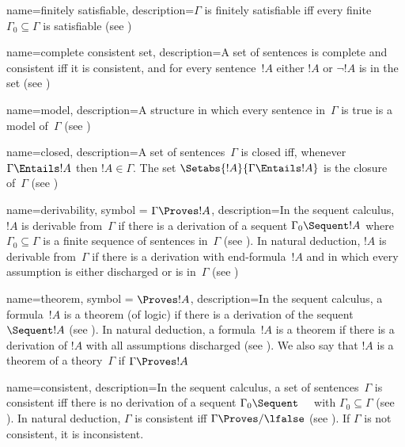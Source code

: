  {
  name={finitely satisfiable},  
  description={$\Gamma$ is finitely satisfiable iff every finite
    $\Gamma_0 \subseteq \Gamma$ is satisfiable (see
    )} }

 {
  name=complete consistent set,
  description={A set of {sentence}s is complete and consistent iff it
    is consistent, and for every {sentence}~$!A$ either $!A$ or
    $\lnot !A$ is in the set (see )} }

 {
  name=model,  
  description={A {structure} in which every {sentence}
    in~$\Gamma$ is true is a model of~$\Gamma$ (see
    )} }

 {
  name=closed, 
  description={A set of {sentence}s~$\Gamma$ is closed iff, whenever
    $\Gamma \Entails !A$ then $!A \in \Gamma$. The set
    $\Setabs{!A}{\Gamma \Entails !A}$ is the closure of~$\Gamma$ (see
    )} }

 {
  name=derivability,
  symbol = {\ensuremath{\Gamma \Proves !A}},  
  description={In the sequent calculus, $!A$ is {derivable} from~$\Gamma$ if there is a
    \gls{derivation} of a \gls{sequent} $\Gamma_0 \Sequent !A$ 
    where $\Gamma_0 \subseteq \Gamma$ is a finite sequence of sentences in~$\Gamma$ (see
    ). In natural deduction, $!A$ is {derivable} from~$\Gamma$ if there is a
    {derivation} with end-{formula}~$!A$ and in which every
    assumption is either {discharged} or is in~$\Gamma$ (see
    )} }

 {
  name={theorem},
  symbol = {\ensuremath{\Proves !A}},
  description={In the sequent calculus, a {formula}~$!A$ is a theorem
    (of logic) if there is a {derivation} of the sequent $\Sequent !A$
    (see ).  In natural deduction, a
    {formula}~$!A$ is a theorem if there is a {derivation} of $!A$
    with all assumptions \gls{discharged}
    (see ). We also say that $!A$ is a
    theorem of a theory~$\Gamma$ if $\Gamma \Proves !A$} }

 {
  name=consistent,
  description={In the sequent calculus, a set of sentences~$\Gamma$ is
    consistent iff there is no \gls{derivation} of a \gls{sequent}
    $\Gamma_0 \Sequent \quad$ with $\Gamma_0 \subseteq \Gamma$
    (see ). In natural deduction, $\Gamma$
    is consistent iff $\Gamma \Proves/ \lfalse$
    (see ). If $\Gamma$ is not consistent,
    it is inconsistent.} }


